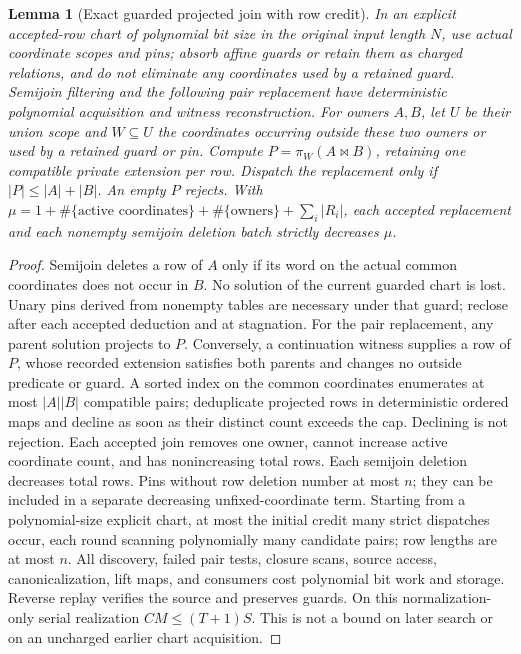 \documentclass[11pt]{article}
\newtheorem{lemma}[theorem]{Lemma}
\begin{document}
\begin{lemma}[Exact guarded projected join with row credit]\label{lem:gd24-row}
In an explicit accepted-row chart of polynomial bit size in the original input length $N$, use actual coordinate scopes and pins; absorb affine guards or retain them as charged relations, and do not eliminate any coordinates used by a retained guard. Semijoin filtering and the following pair replacement have deterministic polynomial acquisition and witness reconstruction. For owners $A,B$, let $U$ be their union scope and $W\subseteq U$ the coordinates occurring outside these two owners or used by a retained guard or pin. Compute $P=\pi_W(A\bowtie B)$, retaining one compatible private extension per row. Dispatch the replacement only if $|P|\le |A|+|B|$. An empty $P$ rejects. With $\mu=1+\#\{\text{active coordinates}\}+\#\{\text{owners}\}+\sum_i |R_i|$, each accepted replacement and each nonempty semijoin deletion batch strictly decreases $\mu$.
\end{lemma}
\begin{proof}
Semijoin deletes a row of $A$ only if its word on the actual common coordinates does not occur in $B$. No solution of the current guarded chart is lost. Unary pins derived from nonempty tables are necessary under that guard; reclose after each accepted deduction and at stagnation. For the pair replacement, any parent solution projects to $P$. Conversely, a continuation witness supplies a row of $P$, whose recorded extension satisfies both parents and changes no outside predicate or guard. A sorted index on the common coordinates enumerates at most $|A||B|$ compatible pairs; deduplicate projected rows in deterministic ordered maps and decline as soon as their distinct count exceeds the cap. Declining is not rejection. Each accepted join removes one owner, cannot increase active coordinate count, and has nonincreasing total rows. Each semijoin deletion decreases total rows. Pins without row deletion number at most $n$; they can be included in a separate decreasing unfixed-coordinate term. Starting from a polynomial-size explicit chart, at most the initial credit many strict dispatches occur, each round scanning polynomially many candidate pairs; row lengths are at most $n$. All discovery, failed pair tests, closure scans, source access, canonicalization, lift maps, and consumers cost polynomial bit work and storage. Reverse replay verifies the source and preserves guards. On this normalization-only serial realization $CM\le(T+1)S$. This is not a bound on later search or on an uncharged earlier chart acquisition.
\end{proof}
\end{document}

